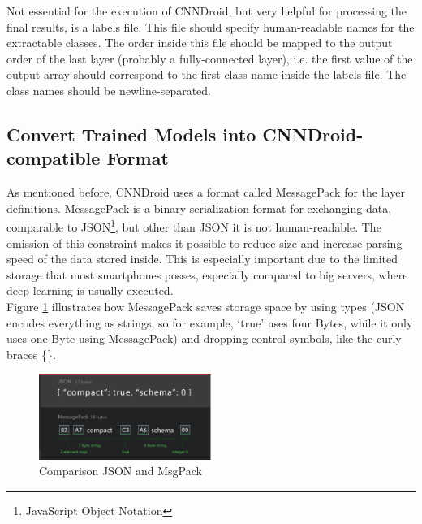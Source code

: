 Not essential for the execution of CNNDroid, but very helpful for processing the final results, is a labels file. This file should specify human-readable names for the extractable classes. The order inside this file should be mapped to the output order of the last layer (probably a fully-connected layer), i.e. the first value of the output array should correspond to the first class name inside the labels file. The class names should be newline-separated.

\subsection{Convert Trained Models into CNNDroid-compatible Format}
As mentioned before, CNNDroid uses a format called MessagePack for the layer definitions. MessagePack is a binary serialization format for exchanging data, comparable to JSON\footnote{JavaScript Object Notation}, but other than JSON it is not human-readable. The omission of this constraint makes it possible to reduce size and increase parsing speed of the data stored inside. This is especially important due to the limited storage that most smartphones posses, especially compared to big servers, where deep learning is usually executed.\\
Figure \ref{fig:json_vs_msgpack} illustrates how MessagePack saves storage space by using types (JSON encodes everything as strings, so for example, `true' uses four Bytes, while it only uses one Byte using MessagePack) and dropping control symbols, like the curly braces \{\}.

\begin{figure}[H]
  \centering
    \includegraphics[width=0.5\textwidth]{json_vs_msgpack.png}
  \caption{Comparison JSON and MsgPack}
  \label{fig:json_vs_msgpack}
\end{figure}

